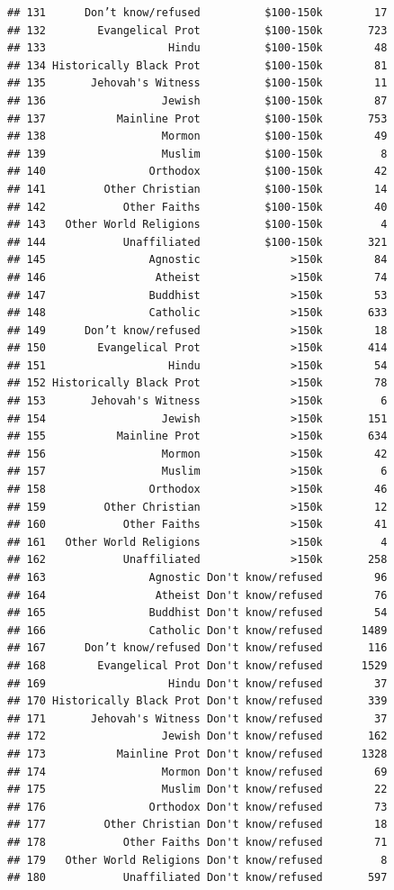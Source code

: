 \documentclass[12pt,letterpaperpaper,openany]{book}
\begin{document}
\begin{verbatim}
## 131      Don’t know/refused          $100-150k        17
## 132        Evangelical Prot          $100-150k       723
## 133                   Hindu          $100-150k        48
## 134 Historically Black Prot          $100-150k        81
## 135       Jehovah's Witness          $100-150k        11
## 136                  Jewish          $100-150k        87
## 137           Mainline Prot          $100-150k       753
## 138                  Mormon          $100-150k        49
## 139                  Muslim          $100-150k         8
## 140                Orthodox          $100-150k        42
## 141         Other Christian          $100-150k        14
## 142            Other Faiths          $100-150k        40
## 143   Other World Religions          $100-150k         4
## 144            Unaffiliated          $100-150k       321
## 145                Agnostic              >150k        84
## 146                 Atheist              >150k        74
## 147                Buddhist              >150k        53
## 148                Catholic              >150k       633
## 149      Don’t know/refused              >150k        18
## 150        Evangelical Prot              >150k       414
## 151                   Hindu              >150k        54
## 152 Historically Black Prot              >150k        78
## 153       Jehovah's Witness              >150k         6
## 154                  Jewish              >150k       151
## 155           Mainline Prot              >150k       634
## 156                  Mormon              >150k        42
## 157                  Muslim              >150k         6
## 158                Orthodox              >150k        46
## 159         Other Christian              >150k        12
## 160            Other Faiths              >150k        41
## 161   Other World Religions              >150k         4
## 162            Unaffiliated              >150k       258
## 163                Agnostic Don't know/refused        96
## 164                 Atheist Don't know/refused        76
## 165                Buddhist Don't know/refused        54
## 166                Catholic Don't know/refused      1489
## 167      Don’t know/refused Don't know/refused       116
## 168        Evangelical Prot Don't know/refused      1529
## 169                   Hindu Don't know/refused        37
## 170 Historically Black Prot Don't know/refused       339
## 171       Jehovah's Witness Don't know/refused        37
## 172                  Jewish Don't know/refused       162
## 173           Mainline Prot Don't know/refused      1328
## 174                  Mormon Don't know/refused        69
## 175                  Muslim Don't know/refused        22
## 176                Orthodox Don't know/refused        73
## 177         Other Christian Don't know/refused        18
## 178            Other Faiths Don't know/refused        71
## 179   Other World Religions Don't know/refused         8
## 180            Unaffiliated Don't know/refused       597
\end{verbatim}
\end{document}
